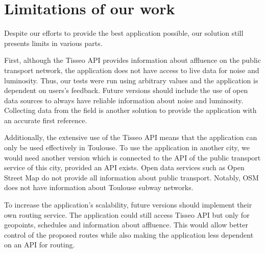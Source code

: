 \section{Limitations of our work}

Despite our efforts to provide the best application possible, our solution still presents limits in various parts.\newline

First, although the Tisseo API provides information about affluence on the public transport network, the application does not have access to live data for noise and luminosity. Thus, our tests were run using arbitrary values and the application is dependent on users’s feedback. Future versions should include the use of open data sources to always have reliable information about noise and luminosity. Collecting data from the field is another solution to provide the application with an accurate first reference.\newline

Additionally, the extensive use of the Tisseo API means that the application can only be used effectively in Toulouse. To use the application in another city, we would need another version which is connected to the API of the public transport service of this city, provided an API exists. Open data services such as Open Street Map do not provide all information about public transport. Notably, OSM does not have information about Toulouse subway networks.\newline

To increase the application's scalability, future versions should implement their own routing service. The application could still access Tisseo API but only for geopoints, schedules and information about affluence. This would allow better control of the proposed routes while also making the application less dependent on an API for routing.
